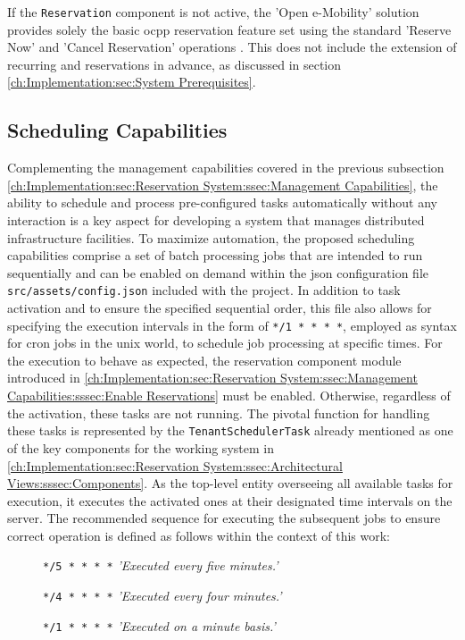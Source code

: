 \noindent If the \texttt{Reservation} component is not active, the ’Open e-Mobility' \cite{noauthor_open_2023} solution provides solely the basic \acrshort{ocpp} reservation feature set using the standard 'Reserve Now' and 'Cancel Reservation' operations \cite{noauthor_ocpp_nodate}. This does not include the extension of recurring and reservations in advance, as discussed in section \ref{ch:Implementation:sec:System Prerequisites}.

\subsection{Scheduling Capabilities}
\label{ch:Implementation:sec:Reservation System:ssec:Scheduling Capabilities}

Complementing the management capabilities covered in the previous subsection \ref{ch:Implementation:sec:Reservation System:ssec:Management Capabilities}, the ability to schedule and process pre-configured tasks automatically without any interaction is a key aspect for developing a system that manages distributed infrastructure facilities. 
To maximize automation, the proposed scheduling capabilities comprise a set of batch processing jobs that are intended to run sequentially and can be enabled on demand within the \acrshort{json} configuration file \texttt{src/assets/config.json} included with the project. 
In addition to task activation and to ensure the specified sequential order, this file also allows for specifying the execution intervals in the form of \texttt{*/1 * * * *}, employed as syntax for \gls{cron} jobs in the \gls{unix} world, to schedule job processing at specific times.
For the execution to behave as expected, the reservation component module introduced in \ref{ch:Implementation:sec:Reservation System:ssec:Management Capabilities:sssec:Enable Reservations} must be enabled. Otherwise, regardless of the activation, these tasks are not running.
The pivotal function for handling these tasks is represented by the \texttt{TenantSchedulerTask} already mentioned as one of the key components for the working system in \ref{ch:Implementation:sec:Reservation System:ssec:Architectural Views:sssec:Components}.
As the top-level entity overseeing all available tasks for execution, it executes the activated ones at their designated time intervals on the server.
The recommended sequence for executing the subsequent jobs to ensure correct operation is defined as follows within the context of this work:
\begin{description}
    \item[]{ \texttt{*/5 * * * *} \quad \textit{'Executed every five minutes.'}}
    \item[]{ \texttt{*/4 * * * *} \quad \textit{'Executed every four minutes.'}}
    \item[]{ \texttt{*/1 * * * *} \quad \textit{'Executed on a minute basis.'}}
\end{description}

